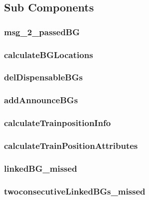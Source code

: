 \subsection{Sub Components}\label{s:calculateTrainPosition_subcomponents}

\subsubsection{msg\_2\_passedBG}

\subsubsection{calculateBGLocations}

\subsubsection{delDispensableBGs}

\subsubsection{addAnnounceBGs}

\subsubsection{calculateTrainpositionInfo}

\subsubsection{calculateTrainPositionAttributes}

\subsubsection{linkedBG\_missed}

\subsubsection{twoconsecutiveLinkedBGs\_missed}






